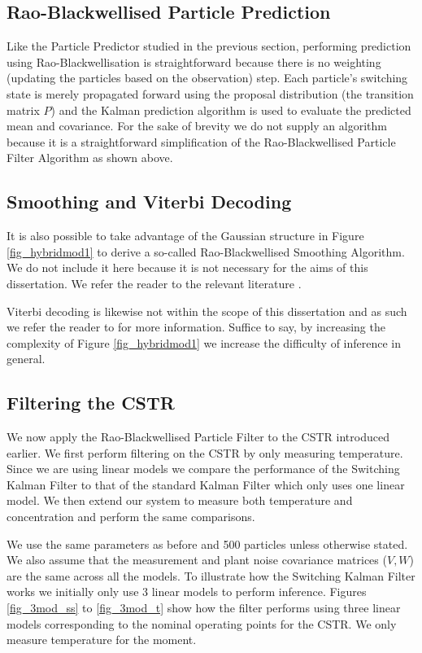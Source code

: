 \documentclass[../masters.tex]{subfiles}
\begin{document}
\subsection{Rao-Blackwellised Particle Prediction}
Like the Particle Predictor studied in the previous section, performing prediction using Rao-Blackwellisation is straightforward because there is no weighting (updating the particles based on the observation) step. Each particle's switching state is merely propagated forward using the proposal distribution (the transition matrix $P$) and the Kalman prediction algorithm is used to evaluate the predicted mean and covariance. For the sake of brevity we do not supply an algorithm because it is a straightforward simplification of the Rao-Blackwellised Particle Filter Algorithm as shown above.

\subsection{Smoothing and Viterbi Decoding}
It is also possible to take advantage of the Gaussian structure in Figure \ref{fig_hybridmod1} to derive a so-called Rao-Blackwellised Smoothing Algorithm. We do not include it here because it is not necessary for the aims of this dissertation. We refer the reader to the relevant literature \cite{chen}\cite{doucet}. 

Viterbi decoding is likewise not within the scope of this dissertation and as such we refer the reader to \cite{murphy1} for more information. Suffice to say, by increasing the complexity of Figure \ref{fig_hybridmod1} we increase the difficulty of inference in general.

\subsection{Filtering the CSTR}
We now apply the Rao-Blackwellised Particle Filter to the CSTR introduced earlier. We first perform filtering on the CSTR by only measuring temperature. Since we are using linear models we compare the performance of the Switching Kalman Filter to that of the standard Kalman Filter which only uses one linear model. We then extend our system to measure both temperature and concentration and perform the same comparisons.

We use the same parameters as before and 500 particles unless otherwise stated. We also assume that the measurement and plant noise covariance matrices ($V,W$) are the same across all the models. To illustrate how the Switching Kalman Filter works we initially only use 3 linear models to perform inference. Figures \ref{fig_3mod_ss} to \ref{fig_3mod_t} show how  the filter performs using three linear models corresponding to the nominal operating points for the CSTR. We only measure temperature for the moment.
\end{document}
